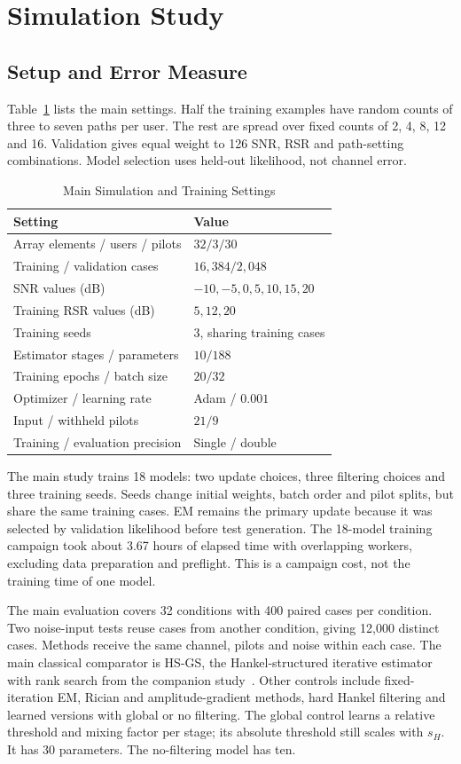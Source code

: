 \documentclass[journal]{IEEEtran}
\begin{document}
\section{Simulation Study}
\subsection{Setup and Error Measure}
Table~\ref{tab:setup} lists the main settings. Half the training examples
have random counts of three to seven paths per user. The rest are spread
over fixed counts of 2, 4, 8, 12 and 16. Validation gives equal weight to
126 SNR, RSR and path-setting combinations. Model selection uses held-out
likelihood, not channel error.

\begin{table}[!t]
\caption{Main Simulation and Training Settings}
\label{tab:setup}
\centering\small
\begin{tabular}{@{}ll@{}}
\toprule
Setting & Value\\\midrule
Array elements / users / pilots & $32/3/30$\\
Training / validation cases & $16{,}384/2{,}048$\\
SNR values (dB) & $-10,-5,0,5,10,15,20$\\
Training RSR values (dB) & $5,12,20$\\
Training seeds & 3, sharing training cases\\
Estimator stages / parameters & $10/188$\\
Training epochs / batch size & $20/32$\\
Optimizer / learning rate & Adam / $0.001$\\
Input / withheld pilots & $21/9$\\
Training / evaluation precision & Single / double\\
\bottomrule
\end{tabular}
\end{table}

The main study trains 18 models: two update choices, three filtering
choices and three training seeds. Seeds change initial weights, batch
order and pilot splits, but share the same training cases. EM remains the
primary update because it was selected by validation likelihood before
test generation. The 18-model training campaign took about 3.67 hours of
elapsed time with overlapping workers, excluding data preparation and
preflight. This is a campaign cost, not the training time of one model.

The main evaluation covers 32 conditions with 400 paired cases per
condition. Two noise-input tests reuse cases from another condition, giving
12,000 distinct cases. Methods receive the same channel, pilots and noise
within each case. The main classical comparator is HS-GS, the
Hankel-structured iterative estimator with rank search from the companion
study~\cite{haatimcompanion}. Other controls include fixed-iteration EM,
Rician and amplitude-gradient methods, hard Hankel filtering and learned
versions with global or no filtering. The global control learns a relative
threshold and mixing factor per stage; its absolute threshold still scales
with $s_H$. It has 30 parameters. The no-filtering model has ten.
\end{document}
